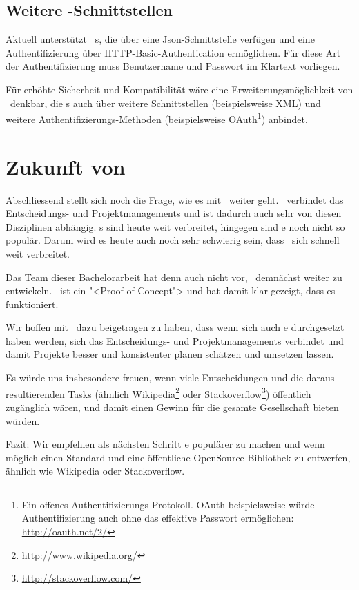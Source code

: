 		\subsection{Weitere \ppt-Schnittstellen}
		\label{subsec:morePPTInterfaces}
			Aktuell unterstützt \eeppi\ \ppt s, die über eine Json-Schnittstelle verfügen
			und eine Authentifizierung über HTTP-Basic-Authentication ermöglichen.
			Für diese Art der Authentifizierung muss Benutzername und Passwort im Klartext vorliegen.
			
			Für erhöhte Sicherheit und Kompatibilität wäre eine Erweiterungsmöglichkeit von \eeppi\ denkbar,
			die \ppt s auch über weitere Schnittstellen (beispielsweise XML)
			und weitere Authentifizierungs-Methoden (beispielsweise OAuth\footnote{Ein offenes Authentifizierungs-Protokoll. OAuth beispielsweise würde Authentifizierung auch ohne das effektive Passwort ermöglichen: \url{http://oauth.net/2/}}) anbindet.
			
	\section{Zukunft von \eeppi}
		Abschliessend stellt sich noch die Frage, wie es mit \eeppi\ weiter geht.
		\eeppi\ verbindet das Entscheidungs- und Projektmanagements und ist dadurch auch sehr von diesen Disziplinen abhängig.
		\ppt s sind heute weit verbreitet, hingegen sind \dks e noch nicht so populär.
		Darum wird es heute auch noch sehr schwierig sein, dass \eeppi\ sich schnell weit verbreitet.
		
		Das Team dieser Bachelorarbeit hat denn auch nicht vor, \eeppi\ demnächst weiter zu entwickeln.
		\eeppi\ ist ein "<Proof of Concept"> und hat damit klar gezeigt, dass es funktioniert.
		
		Wir hoffen mit \eeppi\ dazu beigetragen zu haben, dass wenn sich auch \dks e durchgesetzt haben werden,
		sich das Entscheidungs- und Projektmanagements verbindet und damit Projekte besser und konsistenter planen schätzen und umsetzen lassen.
		
		Es würde uns insbesondere freuen,
		wenn viele Entscheidungen und die daraus resultierenden Tasks
		(ähnlich Wikipedia\footnote{\url{http://www.wikipedia.org/}} oder Stackoverflow\footnote{\url{http://stackoverflow.com/}})
		öffentlich zugänglich wären, und damit einen Gewinn für die gesamte Gesellschaft bieten würden.
		
		Fazit: Wir empfehlen als nächsten Schritt \dks e populärer zu machen
		und wenn möglich einen Standard und eine öffentliche OpenSource-Bibliothek zu entwerfen,
		ähnlich wie Wikipedia oder Stackoverflow.
